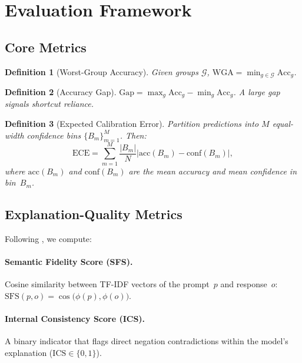 \documentclass[10pt,twocolumn]{article}
\newtheorem{definition}{Definition}
\newcommand{\wga}{\mathrm{WGA}}
\newcommand{\ece}{\mathrm{ECE}}
\begin{document}
\section{Evaluation Framework}
\label{sec:eval}

\subsection{Core Metrics}
\label{subsec:core_metrics}

\begin{definition}[Worst-Group Accuracy]
Given groups $\mathcal{G}$,
$\wga = \min_{g \in \mathcal{G}} \mathrm{Acc}_g$.
\end{definition}

\begin{definition}[Accuracy Gap]
$\mathrm{Gap} = \max_{g}\mathrm{Acc}_g -
\min_{g}\mathrm{Acc}_g$.
A large gap signals shortcut reliance.
\end{definition}

\begin{definition}[Expected Calibration Error]
Partition predictions into $M$ equal-width confidence bins
$\{B_m\}_{m=1}^{M}$.  Then:
\begin{equation}
  \ece = \sum_{m=1}^{M}
  \frac{|B_m|}{N}
  \bigl|\mathrm{acc}(B_m) - \mathrm{conf}(B_m)\bigr|,
  \label{eq:ece}
\end{equation}
where $\mathrm{acc}(B_m)$ and $\mathrm{conf}(B_m)$ are the
mean accuracy and mean confidence in bin~$B_m$.
\end{definition}

\subsection{Explanation-Quality Metrics}
\label{subsec:eq_metrics}

Following \citet{yuan2024revisiting}, we compute:

\paragraph{Semantic Fidelity Score (SFS).}
Cosine similarity between TF-IDF vectors of the prompt~$p$
and response~$o$:
$\mathrm{SFS}(p,o) = \cos\bigl(\phi(p), \phi(o)\bigr)$.

\paragraph{Internal Consistency Score (ICS).}
A binary indicator that flags direct negation contradictions
within the model's explanation ($\mathrm{ICS} \in \{0,1\}$).
\end{document}
